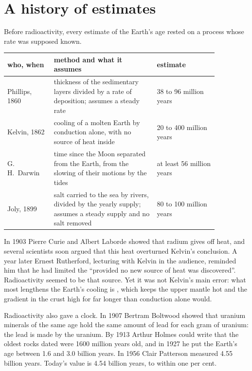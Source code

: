 \section{A history of estimates}

Before radioactivity, every estimate of the Earth's age rested on a process
whose rate was supposed known.

\begin{center}
\small
\begin{tabular}{|p{0.19\linewidth}|p{0.42\linewidth}|p{0.25\linewidth}|}
\hline
who, when & method and what it assumes & estimate \\
\hline
Phillips, 1860 & thickness of the sedimentary layers divided by a rate of deposition; assumes a steady rate & 38 to 96 million years \\
Kelvin, 1862 & cooling of a molten Earth by conduction alone, with no source of heat inside & 20 to 400 million years \\
G.\,H.~Darwin & time since the Moon separated from the Earth, from the slowing of their motions by the tides & at least 56 million years \\
Joly, 1899 & salt carried to the sea by rivers, divided by the yearly supply; assumes a steady supply and no salt removed & 80 to 100 million years \\
\hline
\end{tabular}
\end{center}

\begin{history}
In 1903 Pierre Curie and Albert Laborde showed that radium gives off heat,
and several scientists soon argued that this heat overturned Kelvin's
conclusion. A year later Ernest Rutherford, lecturing with Kelvin in
the audience, reminded him that he had limited the 
``provided no new source of heat was discovered''. Radioactivity seemed to be
that source. Yet it was not Kelvin's main error: what most lengthens the Earth's cooling
is , which keeps the upper mantle hot and the gradient in
the crust high for far longer than conduction alone would.
\end{history}

Radioactivity also gave a clock. In 1907 Bertram Boltwood showed that
uranium minerals of the same age hold the same amount of lead for each gram
of uranium: the lead is made by the uranium. By 1913 Arthur Holmes could
write that the oldest rocks dated were \num{1600} million years old, and in
1927 he put the Earth's age between 1.6 and 3.0 billion years. In 1956 Clair
Patterson measured 4.55 billion years. Today's value is 4.54 billion years,
to within one per cent.

